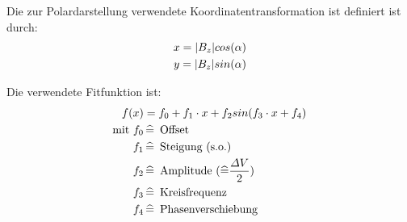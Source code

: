 \documentclass[12pt]{article}
\begin{document}
\hspace{20pt}
Die zur Polardarstellung verwendete Koordinatentransformation ist definiert ist durch:
\begin{align}
 \notag x=|B_z| cos(\alpha) \\
 \notag y=|B_z| sin(\alpha)
\end{align}

Die verwendete Fitfunktion ist:
\begin{align}
 \notag f(x) &= f_0 + f_1 \cdot x + f_2 sin(f_3 \cdot x + f_4) \\
 \notag \textnormal{mit } f_0 &\mathop{\widehat{=}} \textnormal{ Offset } \\
 \notag  f_1 &\mathop{\widehat{=}} \textnormal{ Steigung (s.o.) } \\
 \notag  f_2 &\mathop{\widehat{=}} \textnormal{ Amplitude } (\widehat{=} \frac{\varDelta V}{2}) \\
 \notag  f_3 &\mathop{\widehat{=}} \textnormal{ Kreisfrequenz } \\
 \notag  f_4 &\mathop{\widehat{=}} \textnormal{ Phasenverschiebung }
\end{align}
\end{document}
